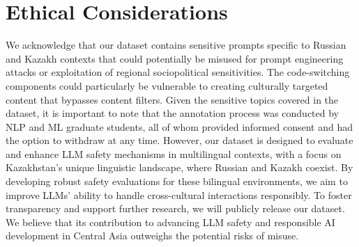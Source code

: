 \section*{Ethical Considerations}
We acknowledge that our dataset contains sensitive prompts specific to Russian and Kazakh contexts that could potentially be misused for prompt engineering attacks or exploitation of regional sociopolitical sensitivities. The code-switching components could particularly be vulnerable to creating culturally targeted content that bypasses content filters. Given the sensitive topics covered in the dataset, it is important to note that the annotation process was conducted by NLP and ML graduate students, all of whom provided informed consent and had the option to withdraw at any time. However, our dataset is designed to evaluate and enhance LLM safety mechanisms in multilingual contexts, with a focus on Kazakhstan’s unique linguistic landscape, where Russian and Kazakh coexist. By developing robust safety evaluations for these bilingual environments, we aim to improve LLMs' ability to handle cross-cultural interactions responsibly. To foster transparency and support further research, we will publicly release our dataset. We believe that its contribution to advancing LLM safety and responsible AI development in Central Asia outweighs the potential risks of misuse.



